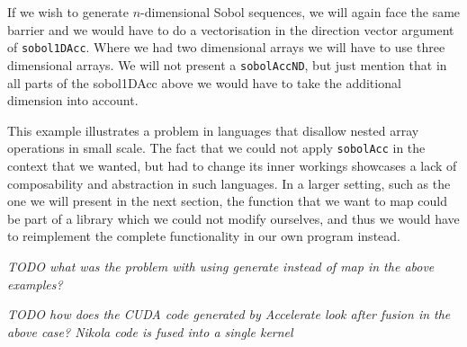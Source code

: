 \documentclass{llncs2e/llncs}
\begin{document}
If we wish to generate $n$-dimensional Sobol sequences, we will again
face the same barrier and we would have to do a vectorisation in the
direction vector argument of \verb|sobol1DAcc|. Where we had two
dimensional arrays we will have to use three dimensional arrays. We
will not present a \verb|sobolAccND|, but just mention that in all
parts of the sobol1DAcc above we would have to take the additional
dimension into account.

This example illustrates a problem in languages that disallow nested
array operations in small scale. The fact that we could not apply
\verb|sobolAcc| in the context that we wanted, but had to change its
inner workings showcases a lack of composability and abstraction in
such languages. In a larger setting, such as the one we will present
in the next section, the function that we want to map could be part of
a library which we could not modify ourselves, and thus we would have
to reimplement the complete functionality in our own program instead.

\emph{TODO what was the problem with using generate instead of map in the
above examples?}

\emph{TODO how does the CUDA code generated by Accelerate look after
  fusion in the above case? Nikola code is fused into a single kernel}


\end{document}

